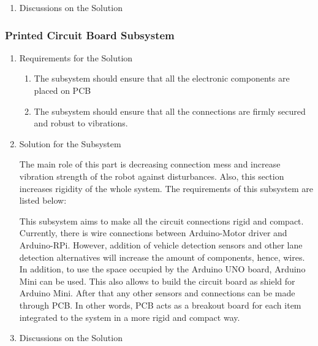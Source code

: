 \documentclass[a4paper,12pt]{article}
\begin{document}
\begin{enumerate}
\begin{enumerate}
			\item {Discussions on the Solution}
			
		\end{enumerate}
			
	
	
	
	\subsubsection{Printed Circuit Board Subsystem}
	
		\begin{enumerate}
			\item {Requirements for the Solution}
			
			\begin{enumerate}
						\item The subsystem should ensure that all the electronic components are placed on PCB
						\item The subsystem should ensure that all the connections are firmly secured and robust to vibrations.
					\end{enumerate} 
					
			\item {Solution for the Subsystem}
			
			The main role of this part is decreasing connection mess and increase vibration strength of the robot against disturbances. Also, this section increases rigidity of the whole system. The requirements of this subsystem are listed below:	
	
	This subsystem aims to make all the circuit connections rigid and compact. Currently, there is wire connections between Arduino-Motor driver and Arduino-RPi. However, addition of vehicle detection sensors and other lane detection alternatives will increase the amount of components, hence, wires. In addition, to use the space occupied by the Arduino UNO board, Arduino Mini can be used. This also allows to build the circuit board as shield for Arduino Mini. After that any other sensors and connections can be made through PCB. In other words, PCB acts as a breakout board for each item integrated to the system in a more rigid and compact way.
			
			\item {Discussions on the Solution}
			
		\end{enumerate}	
	
	
	
	
	
	

\end{enumerate}
\end{document}
